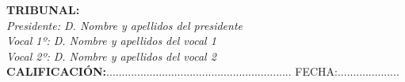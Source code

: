 \begin{flushleft}
\textbf{TRIBUNAL:}\\
\vspace{1.5cm}
\textit{Presidente: D. Nombre y apellidos del presidente}\\
\vspace{1.5cm}
\textit{Vocal 1º: D. Nombre y apellidos del vocal 1}\\
\vspace{1.5cm}
\textit{Vocal 2º: D. Nombre y apellidos del vocal 2}\\
\vspace{1.5cm}
\textbf{CALIFICACIÓN:}............................................................ FECHA:.................... \\
\end{flushleft}

